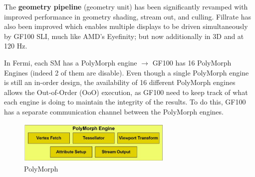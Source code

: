 The {\bf geometry pipeline} (geometry unit) has been significantly
revamped with improved performance in geometry shading, stream out,
and culling. Fillrate has also been improved which enables multiple
displays to be driven simultaneously by GF100 SLI, much like AMD's
Eyefinity; but now additionally in 3D and at 120 Hz.

\begin{framed}
  In Fermi, each SM has a PolyMorph engine $\rightarrow$ GF100 has 16
  PolyMorph Engines (indeed 2 of them are disable). Even though a
  single PolyMorph engine is still an in-order design, the
  availability of 16 different PolyMorph engines allows the
  Out-of-Order (OoO) execution, as GF100 need to keep track of what
  each engine is doing to maintain the integrity of the results. To do
  this, GF100 has a separate communication channel between the
  PolyMorph engines.
\end{framed}

\begin{figure}[hbt]
  \centerline{\includegraphics[height=2cm,
    angle=0]{./images/polymorph.eps}}
\caption{PolyMorph}
\label{fig:polymorph}
\end{figure}

